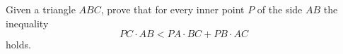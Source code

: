 Given a triangle $ABC$, prove that for every inner point $P$ of the side $AB$ the inequality $$PC\cdot AB<PA\cdot BC+PB\cdot AC$$holds.